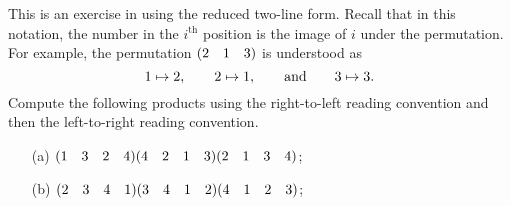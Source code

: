 \begin{exercise}\label{ex:ch1-reduced_two-line_form}
    This is an exercise in using the reduced two-line form. Recall that in this notation, the number in the \(i^{\text{th}}\) position is the image of \(i\) under the permutation. For example, the permutation \((2 \quad 1 \quad 3)\) is understood as
    \[
    1 \mapsto 2,\qquad 2 \mapsto 1,\hspace{20pt}\text{and}\hspace{20pt} 3 \mapsto 3.
    \]
    Compute the following products using the right-to-left reading convention and then the left-to-right reading convention.
    \vspace*{-10pt}
    \begin{itemize}[nolistsep]
        \item[(a)] \q\((1 \quad 3 \quad 2 \quad 4)(4 \quad 2 \quad 1 \quad 3)(2 \quad 1 \quad 3 \quad 4)\);
        \item[(b)] \q\((2 \quad 3 \quad 4 \quad 1)(3 \quad 4 \quad 1 \quad 2)(4 \quad 1 \quad 2 \quad 3)\);
    \end{itemize}
\end{exercise}
